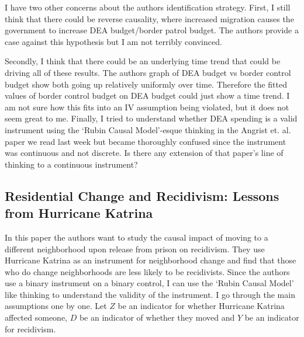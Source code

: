 \documentclass[12 pt, leqno]{article}
\begin{document}
I have two other concerns about the authors identification strategy. First, I still think that there could be reverse causality, where increased migration causes the government to increase DEA budget/border patrol budget. The authors provide a case against this hypothesis but I am not terribly convinced. 

Secondly, I think that there could be an underlying time trend that could be driving all of these results. The authors graph of DEA budget vs border control budget show both going up relatively uniformly over time. Therefore the fitted values of border control budget on DEA budget could just show a time trend. I am not sure how this fits into an IV assumption being violated, but it does not seem great to me. Finally, I tried to understand whether DEA spending is a valid instrument using the `Rubin Causal Model'-esque thinking in the Angrist et. al. paper we read last week but became thoroughly confused since the instrument was continuous and not discrete. Is there any extension of that paper's line of thinking to a continuous instrument?

\subsection*{Residential Change and Recidivism: Lessons from Hurricane Katrina}

In this paper the authors want to study the causal impact of moving to a different neighborhood upon release from prison on recidivism. They use Hurricane Katrina as an instrument for neighborhood change and find that those who do change neighborhoods are less likely to be recidivists. Since the authors use a binary instrument on a binary control, I can use the `Rubin Causal Model' like thinking to understand the validity of the instrument. I go through the main assumptions one by one. Let $Z$ be an indicator for whether Hurricane Katrina affected someone, $D$ be an indicator of whether they moved and $Y$ be an indicator for recidivism.  
\end{document}
